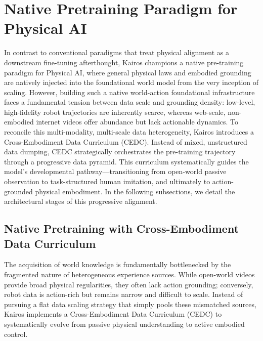 \documentclass{llmxive}
\begin{document}
\section{Native Pretraining Paradigm for Physical AI}

In contrast to conventional paradigms that treat physical alignment as a downstream fine-tuning afterthought, Kairos champions a native pre-training paradigm for Physical AI, where general physical laws and embodied grounding are natively injected into the foundational world model from the very inception of scaling. However, building such a native world-action foundational infrastructure faces a fundamental tension between data scale and grounding density: low-level, high-fidelity robot trajectories are inherently scarce, whereas web-scale, non-embodied internet videos offer abundance but lack actionable dynamics. To reconcile this multi-modality, multi-scale data heterogeneity, Kairos introduces a Cross-Embodiment Data Curriculum (CEDC). Instead of mixed, unstructured data dumping, CEDC strategically orchestrates the pre-training trajectory through a progressive data pyramid. This curriculum systematically guides the model’s developmental pathway—transitioning from open-world passive observation to task-structured human imitation, and ultimately to action-grounded physical embodiment. In the following subsections, we detail the architectural stages of this progressive alignment.


\subsection{Native Pretraining with Cross-Embodiment Data Curriculum}\label{subsection:curriculum}

The acquisition of world knowledge is fundamentally bottlenecked by the fragmented nature of heterogeneous experience sources. While open-world videos provide broad physical regularities, they often lack action grounding; conversely, robot data is action-rich but remains narrow and difficult to scale. Instead of pursuing a flat data scaling strategy that simply pools these mismatched sources, Kairos implements a Cross-Embodiment Data Curriculum (CEDC) to systematically evolve from passive physical understanding to active embodied control.
\end{document}
